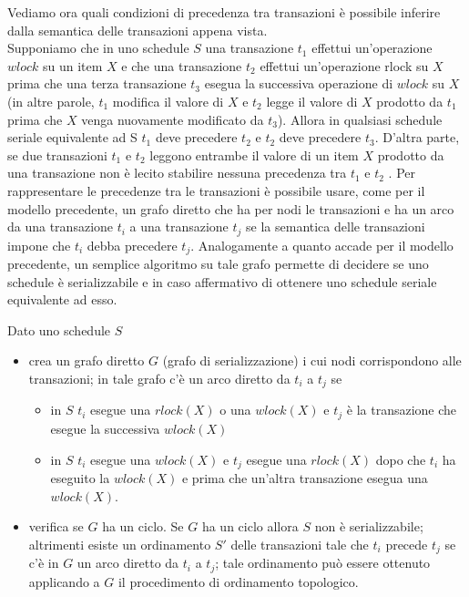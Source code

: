 Vediamo ora quali condizioni di precedenza tra transazioni è possibile inferire dalla semantica delle
transazioni appena vista.\\
Supponiamo che in uno schedule $S$ una transazione $t_1$ effettui un'operazione $wlock$ su un item $X$ e
che una transazione $t_2$ effettui un'operazione rlock su $X$ prima che una terza transazione $t_3$ esegua
la successiva operazione di $wlock$ su $X$ (in altre parole, $t_1$ modifica il valore di $X$ e $t_2$ legge il
valore di $X$ prodotto da $t_1$ prima che $X$ venga nuovamente modificato da $t_3$). Allora in qualsiasi
schedule seriale equivalente ad S $t_1$ deve precedere $t_2$ e $t_2$ deve precedere $t_3$. D'altra parte, se due
transazioni $t_1$ e $t_2$ leggono entrambe il valore di un item $X$ prodotto da una transazione non è lecito
stabilire nessuna precedenza tra $t_1$ e $t_2$ .
Per rappresentare le precedenze tra le transazioni è possibile usare, come per il modello precedente,
un grafo diretto che ha per nodi le transazioni e ha un arco da una transazione $t_i$ a una transazione
$t_j$ se la semantica delle transazioni impone che $t_i$ debba precedere $t_j$. Analogamente a quanto
accade per il modello precedente, un semplice algoritmo su tale grafo permette di decidere se uno
schedule è serializzabile e in caso affermativo di ottenere uno schedule seriale equivalente ad esso.

\begin{alg}
Dato uno schedule $S$
\begin{itemize}
 \item crea un grafo diretto $G$ (grafo di serializzazione) i cui nodi corrispondono alle transazioni; in
tale grafo c'è un arco diretto da $t_i$ a $t_j$ se
 \begin{itemize}
  \item in $S$ $t_i$ esegue una $rlock(X)$ o una $wlock(X)$ e $t_j$ è la transazione che esegue la successiva
   $wlock(X)$
  \item in $S$ $t_i$ esegue una $wlock(X)$ e $t_j$ esegue una $rlock(X)$ dopo che $t_i$ ha eseguito la $wlock(X)$ e
prima che un'altra transazione esegua una $wlock(X)$.
 \end{itemize}
\item verifica se $G$ ha un ciclo. Se $G$ ha un ciclo allora $S$ non è serializzabile; altrimenti esiste un
ordinamento $S'$ delle transazioni tale che $t_i$ precede $t_j$ se c'è in $G$ un arco diretto da $t_i$ a $t_j$; tale
ordinamento può essere ottenuto applicando a $G$ il procedimento di ordinamento topologico.
\end{itemize}
\end{alg}

